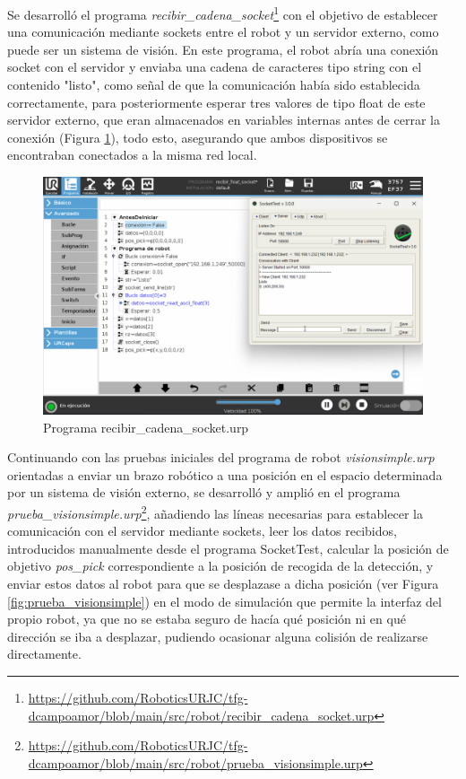 Se desarrolló el programa \textit{recibir\_cadena\_socket}\footnote{\url{https://github.com/RoboticsURJC/tfg-dcampoamor/blob/main/src/robot/recibir_cadena_socket.urp}} con el objetivo de establecer una comunicación mediante sockets entre el robot y un servidor externo, como puede ser un sistema de visión. En este programa, el robot abría una conexión socket con el servidor y enviaba una cadena de caracteres tipo string con el contenido "listo", como señal de que la comunicación había sido establecida correctamente, para posteriormente esperar tres valores de tipo float de este servidor externo, que eran almacenados en variables internas antes de cerrar la conexión (Figura \ref{fig:recibir_cadena_socket}), todo esto, asegurando que ambos dispositivos se encontraban conectados a la misma red local.

   \begin{figure}[H]
     \centering
     \begin{center}
       \includegraphics[width=130mm]{figs/recibir_cadena_socket.png}
     \end{center}
     \caption{Programa recibir\_cadena\_socket.urp}
     \label{fig:recibir_cadena_socket}
  \end{figure}

Continuando con las pruebas iniciales del programa de robot \textit{visionsimple.urp} orientadas a enviar un brazo robótico a una posición en el espacio determinada por un sistema de visión externo, se desarrolló y amplió en el programa \textit{prueba\_visionsimple.urp}\footnote{\url{https://github.com/RoboticsURJC/tfg-dcampoamor/blob/main/src/robot/prueba_visionsimple.urp}}, añadiendo las líneas necesarias para establecer la comunicación con el servidor mediante sockets, leer los datos recibidos, introducidos manualmente desde el programa SocketTest, calcular la posición de objetivo \textit{pos\_pick} correspondiente a la posición de recogida de la detección, y enviar estos datos al robot para que se desplazase a dicha posición (ver Figura \ref{fig:prueba_visionsimple}) en el modo de simulación que permite la interfaz del propio robot, ya que no se estaba seguro de hacía qué posición ni en qué dirección se iba a desplazar, pudiendo ocasionar alguna colisión de realizarse directamente. 


